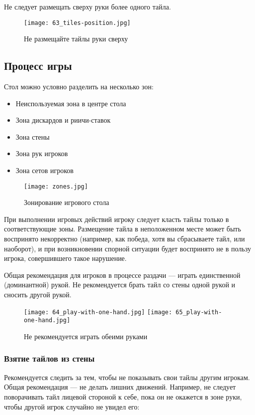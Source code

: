 \newpage

Не следует размещать сверху руки более одного тайла.

\begin{figure}[H]
	\centering
	\texttt{[image: 63\_tiles-position.jpg]}
	\caption{Не размещайте тайлы руки сверху}
\end{figure}

\subsection{Процесс игры}

Стол можно условно разделить на несколько зон:
\begin{itemize}
	\item Неиспользуемая зона в центре стола
	\item Зона дискардов и риичи-ставок
	\item Зона стены
	\item Зона рук игроков
	\item Зона сетов игроков
\end{itemize}

\begin{figure}[H]
	\centering
	\texttt{[image: zones.jpg]}
	\caption{Зонирование игрового стола}
\end{figure}

При выполнении игровых действий игроку следует класть тайлы только в соответствующие зоны. Размещение тайла в неположенном месте может быть воспринято некорректно (например, как победа, хотя вы сбрасываете тайл, или наоборот), и при возникновении спорной ситуации будет воспринято не в пользу игрока, совершившего такое нарушение.

Общая рекомендация для игроков в процессе раздачи --- играть единственной (доминантной) рукой. Не рекомендуется брать тайл со стены одной рукой и сносить другой рукой.

\begin{figure}[H]
	\centering
	\texttt{[image: 64\_play-with-one-hand.jpg]}
	\texttt{[image: 65\_play-with-one-hand.jpg]}
	\caption{Не рекомендуется играть обеими руками}
\end{figure}

\subsubsection{Взятие тайлов из стены}

Рекомендуется следить за тем, чтобы не показывать свои тайлы другим игрокам. Общая рекомендация --- не делать лишних движений. Например, не следует поворачивать тайл лицевой стороной к себе, пока он не окажется в зоне руки, чтобы другой игрок случайно не увидел его:


